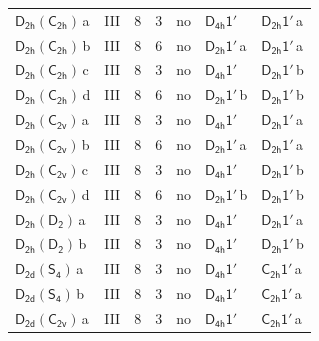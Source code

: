 \documentclass[10pt,a4paper]{article}
\numberwithin{equation}{section}
\newcommand{\grp}[1]{\mathsf{#1}}
\newcommand{\clsletter}[1]{\,{\scriptsize\color{black!55}#1}}
\begin{document}
{\begin{longtable}{@{}llrrlll@{}}
\href{D2h-C2h.pdf}{$\grp{D_{2h}}(\grp{C_{2h}})$}\clsletter{a} & III & 8 & 3 & no & \href{D4h-1p.pdf}{$\grp{D_{4h}1'}$} & \href{D2h-1p.pdf}{$\grp{D_{2h}1'}$}\clsletter{a}\\
\href{D2h-C2h.pdf}{$\grp{D_{2h}}(\grp{C_{2h}})$}\clsletter{b} & III & 8 & 6 & no & \href{D2h-1p.pdf}{$\grp{D_{2h}1'}$}\clsletter{a} & \href{D2h-1p.pdf}{$\grp{D_{2h}1'}$}\clsletter{a}\\
\href{D2h-C2h.pdf}{$\grp{D_{2h}}(\grp{C_{2h}})$}\clsletter{c} & III & 8 & 3 & no & \href{D4h-1p.pdf}{$\grp{D_{4h}1'}$} & \href{D2h-1p.pdf}{$\grp{D_{2h}1'}$}\clsletter{b}\\
\href{D2h-C2h.pdf}{$\grp{D_{2h}}(\grp{C_{2h}})$}\clsletter{d} & III & 8 & 6 & no & \href{D2h-1p.pdf}{$\grp{D_{2h}1'}$}\clsletter{b} & \href{D2h-1p.pdf}{$\grp{D_{2h}1'}$}\clsletter{b}\\
\href{D2h-C2v.pdf}{$\grp{D_{2h}}(\grp{C_{2v}})$}\clsletter{a} & III & 8 & 3 & no & \href{D4h-1p.pdf}{$\grp{D_{4h}1'}$} & \href{D2h-1p.pdf}{$\grp{D_{2h}1'}$}\clsletter{a}\\
\href{D2h-C2v.pdf}{$\grp{D_{2h}}(\grp{C_{2v}})$}\clsletter{b} & III & 8 & 6 & no & \href{D2h-1p.pdf}{$\grp{D_{2h}1'}$}\clsletter{a} & \href{D2h-1p.pdf}{$\grp{D_{2h}1'}$}\clsletter{a}\\
\href{D2h-C2v.pdf}{$\grp{D_{2h}}(\grp{C_{2v}})$}\clsletter{c} & III & 8 & 3 & no & \href{D4h-1p.pdf}{$\grp{D_{4h}1'}$} & \href{D2h-1p.pdf}{$\grp{D_{2h}1'}$}\clsletter{b}\\
\href{D2h-C2v.pdf}{$\grp{D_{2h}}(\grp{C_{2v}})$}\clsletter{d} & III & 8 & 6 & no & \href{D2h-1p.pdf}{$\grp{D_{2h}1'}$}\clsletter{b} & \href{D2h-1p.pdf}{$\grp{D_{2h}1'}$}\clsletter{b}\\
\href{D2h-D2.pdf}{$\grp{D_{2h}}(\grp{D_{2}})$}\clsletter{a} & III & 8 & 3 & no & \href{D4h-1p.pdf}{$\grp{D_{4h}1'}$} & \href{D2h-1p.pdf}{$\grp{D_{2h}1'}$}\clsletter{a}\\
\href{D2h-D2.pdf}{$\grp{D_{2h}}(\grp{D_{2}})$}\clsletter{b} & III & 8 & 3 & no & \href{D4h-1p.pdf}{$\grp{D_{4h}1'}$} & \href{D2h-1p.pdf}{$\grp{D_{2h}1'}$}\clsletter{b}\\
\href{D2d-S4.pdf}{$\grp{D_{2d}}(\grp{S_{4}})$}\clsletter{a} & III & 8 & 3 & no & \href{D4h-1p.pdf}{$\grp{D_{4h}1'}$} & \href{C2h-1p.pdf}{$\grp{C_{2h}1'}$}\clsletter{a}\\
\href{D2d-S4.pdf}{$\grp{D_{2d}}(\grp{S_{4}})$}\clsletter{b} & III & 8 & 3 & no & \href{D4h-1p.pdf}{$\grp{D_{4h}1'}$} & \href{C2h-1p.pdf}{$\grp{C_{2h}1'}$}\clsletter{a}\\
\href{D2d-C2v.pdf}{$\grp{D_{2d}}(\grp{C_{2v}})$}\clsletter{a} & III & 8 & 3 & no & \href{D4h-1p.pdf}{$\grp{D_{4h}1'}$} & \href{C2h-1p.pdf}{$\grp{C_{2h}1'}$}\clsletter{a}\\

\end{longtable}}
\end{document}
